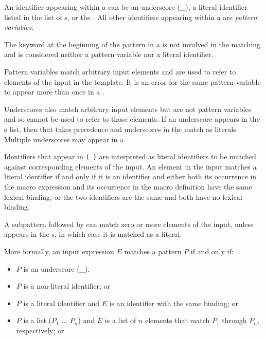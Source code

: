 \begin{entry}
An identifier appearing within a  can be an underscore
({\cf \_}), a literal identifier listed in the list of s,
or the .
All other identifiers appearing within a  are
{\em pattern variables}.

The keyword at the beginning of the pattern in a
 is not involved in the matching and
is considered neither a pattern variable nor a literal identifier.

Pattern variables match arbitrary input elements and
are used to refer to elements of the input in the template.
It is an error for the same pattern variable to appear more than once in a
.

Underscores also match arbitrary input elements but are not pattern variables
and so cannot be used to refer to those elements.  If an underscore appears
in the s list, then that takes precedence and
underscores in the  match as literals.
Multiple underscores may appear in a .

Identifiers that appear in \texttt{( \dotsfoo)} are
interpreted as literal
identifiers to be matched against corresponding elements of the input.
An element in the input matches a literal identifier if and only if it is an
identifier and either both its occurrence in the macro expression and its
occurrence in the macro definition have the same lexical binding, or
the two identifiers are the same and both have no lexical binding.

A subpattern followed by  can match zero or more elements of
the input, unless  appears in the s, in which
case it is matched as a literal.

More formally, an input expression $E$ matches a pattern $P$ if and only if:

\begin{itemize}
\item $P$ is an underscore ({\cf \_}).

\item $P$ is a non-literal identifier; or

\item $P$ is a literal identifier and $E$ is an identifier with the same
      binding; or

\item $P$ is a list {\cf ($P_1$ $\dots$ $P_n$)} and $E$ is a
      list of $n$
      elements that match $P_1$ through $P_n$, respectively; or


\end{itemize}
\end{entry}
